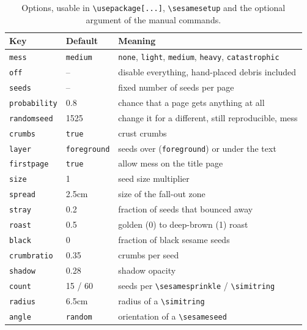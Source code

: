 \documentclass[11pt,a4paper]{article}
\begin{document}
\begin{table}[t]
\centering\small
\begin{tabular}{@{}lll@{}}
\toprule
Key & Default & Meaning\\
\midrule
\texttt{mess}        & \texttt{medium} & \texttt{none}, \texttt{light}, \texttt{medium}, \texttt{heavy}, \texttt{catastrophic}\\
\texttt{off}         & --              & disable everything, hand-placed debris included\\
\texttt{seeds}       & --              & fixed number of seeds per page\\
\texttt{probability} & 0.8             & chance that a page gets anything at all\\
\texttt{randomseed}  & 1525            & change it for a different, still reproducible, mess\\
\texttt{crumbs}      & \texttt{true}   & crust crumbs\\
\texttt{layer}       & \texttt{foreground} & seeds over (\texttt{foreground}) or under the text\\
\texttt{firstpage}   & \texttt{true}   & allow mess on the title page\\
\texttt{size}        & 1               & seed size multiplier\\
\texttt{spread}      & 2.5cm           & size of the fall-out zone\\
\texttt{stray}       & 0.2             & fraction of seeds that bounced away\\
\texttt{roast}       & 0.5             & golden (0) to deep-brown (1) roast\\
\texttt{black}       & 0               & fraction of black sesame seeds\\
\texttt{crumbratio}  & 0.35            & crumbs per seed\\
\texttt{shadow}      & 0.28            & shadow opacity\\
\midrule
\texttt{count}       & 15 / 60         & seeds per \verb|\sesamesprinkle| / \verb|\simitring|\\
\texttt{radius}      & 6.5cm           & radius of a \verb|\simitring|\\
\texttt{angle}       & \texttt{random} & orientation of a \verb|\sesameseed|\\
\bottomrule
\end{tabular}
\caption{Options, usable in \texttt{\textbackslash usepackage[...]},
\texttt{\textbackslash sesamesetup} and the optional argument of the manual
commands.}
\label{tab:options}
\end{table}
\end{document}
